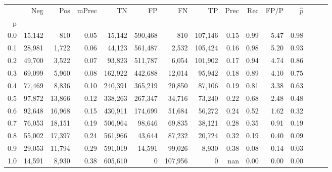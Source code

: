 \begin{tabular}{rrrrrrrrrrrrrrr}
\toprule
{} &     Neg &     Pos & mPrec &       TN &       FP &       FN &       TP &  Prec &   Rec &  FP/P & $\hat{p}$ \\
p   &         &         &       &          &          &          &          &       &       &       &           \\
\midrule
0.0 &  15,142 &     810 &  0.05 &   15,142 &  590,468 &      810 &  107,146 &  0.15 &  0.99 &  5.47 &      0.98 \\
0.1 &  28,981 &   1,722 &  0.06 &   44,123 &  561,487 &    2,532 &  105,424 &  0.16 &  0.98 &  5.20 &      0.93 \\
0.2 &  49,700 &   3,522 &  0.07 &   93,823 &  511,787 &    6,054 &  101,902 &  0.17 &  0.94 &  4.74 &      0.86 \\
0.3 &  69,099 &   5,960 &  0.08 &  162,922 &  442,688 &   12,014 &   95,942 &  0.18 &  0.89 &  4.10 &      0.75 \\
0.4 &  77,469 &   8,836 &  0.10 &  240,391 &  365,219 &   20,850 &   87,106 &  0.19 &  0.81 &  3.38 &      0.63 \\
0.5 &  97,872 &  13,866 &  0.12 &  338,263 &  267,347 &   34,716 &   73,240 &  0.22 &  0.68 &  2.48 &      0.48 \\
0.6 &  92,648 &  16,968 &  0.15 &  430,911 &  174,699 &   51,684 &   56,272 &  0.24 &  0.52 &  1.62 &      0.32 \\
0.7 &  76,053 &  18,151 &  0.19 &  506,964 &   98,646 &   69,835 &   38,121 &  0.28 &  0.35 &  0.91 &      0.19 \\
0.8 &  55,002 &  17,397 &  0.24 &  561,966 &   43,644 &   87,232 &   20,724 &  0.32 &  0.19 &  0.40 &      0.09 \\
0.9 &  29,053 &  11,794 &  0.29 &  591,019 &   14,591 &   99,026 &    8,930 &  0.38 &  0.08 &  0.14 &      0.03 \\
1.0 &  14,591 &   8,930 &  0.38 &  605,610 &        0 &  107,956 &        0 &   nan &  0.00 &  0.00 &      0.00 \\
\bottomrule
\end{tabular}
